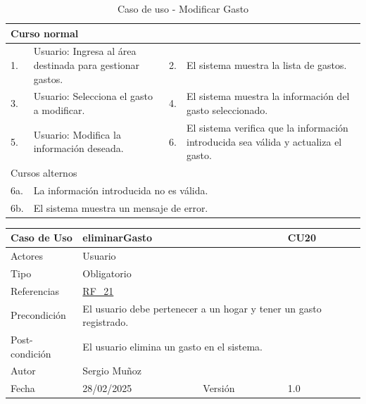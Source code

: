 \begin{table}[H]
    \centering
    \begin{tabular}{| m{} | m{} | m{} | m{} |}
        \hline
        \multicolumn{4}{|m{0.9\textwidth}|}{Curso normal} \\ 
        \hline
        1. & Usuario: Ingresa al área destinada para gestionar gastos. 
        & 2. & El sistema muestra la lista de gastos. \\ 
        \hline
        3. & Usuario: Selecciona el gasto a modificar. 
        & 4. & El sistema muestra la información del gasto seleccionado. \\ 
        \hline
        5. & Usuario: Modifica la información deseada. 
        & 6. & El sistema verifica que la información introducida sea válida y actualiza el gasto. \\ 
        \hline
        \multicolumn{4}{|m{0.9\textwidth}|}{Cursos alternos} \\ 
        \hline 
        6a. & \multicolumn{3}{l|}{La información introducida no es válida.} \\ 
        \hline
        6b. & \multicolumn{3}{l|}{El sistema muestra un mensaje de error.} \\ 
        \hline
    \end{tabular}
    \caption{Caso de uso - Modificar Gasto}
\end{table}

\newpage

\begin{table}[H]
    \centering
    \begin{tabular}{| m{} | m{} | m{} | m{} |}
        \hline
        \rowcolor[HTML]{C0C0C0} Caso de Uso & \multicolumn{2}{|m{0.43\textwidth}|}{eliminarGasto} &  CU20\\ 
        \hline
        Actores & \multicolumn{3}{l|}{Usuario} \\ 
        \hline
        Tipo & \multicolumn{3}{l|}{Obligatorio} \\ 
        \hline
        Referencias & \multicolumn{3}{l|}{\hyperref[req:RF21]{RF\_21}} \\ 
        \hline
        Precondición & \multicolumn{3}{m{0.67\textwidth}|}{El usuario debe pertenecer a un hogar y tener un gasto registrado.} \\ 
        \hline
        Post-condición & \multicolumn{3}{m{0.67\textwidth}|}{El usuario elimina un gasto en el sistema.} \\ 
        \hline
        Autor & \multicolumn{3}{l|}{Sergio Muñoz} \\ 
        \hline
        Fecha & 28/02/2025 & Versión & 1.0 \\ 
        \hline
    \end{tabular}
\end{table}

